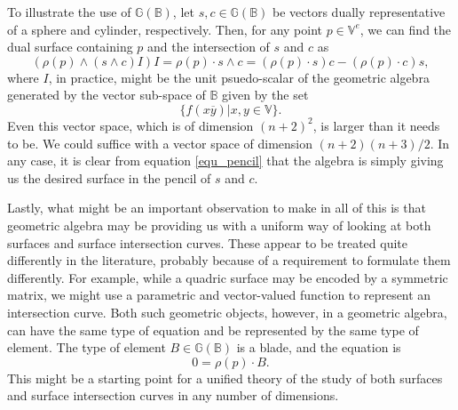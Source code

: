 \documentclass{birkjour}
\theoremstyle{definition}
\theoremstyle{remark}
\numberwithin{equation}{section}
\newcommand{\G}{\mathbb{G}}
\newcommand{\V}{\mathbb{V}}
\newcommand{\B}{\mathbb{B}}
\begin{document}
To illustrate the use of $\G(\B)$, let $s,c\in\G(\B)$ be vectors dually representative
of a sphere and cylinder, respectively.  Then, for any point $p\in\V^e$, we can find
the dual surface containing $p$ and the intersection of $s$ and $c$ as
\begin{equation}\label{equ_pencil}
(\rho(p)\wedge(s\wedge c)I)I = \rho(p)\cdot s\wedge c = (\rho(p)\cdot s)c - (\rho(p)\cdot c)s,
\end{equation}
where $I$, in practice, might be the unit psuedo-scalar of the geometric algebra
generated by the vector sub-space of $\B$ given by the set
\begin{equation}
\{f(x\overline{y})|x,y\in\V\}.
\end{equation}
Even this vector space, which is of dimension $(n+2)^2$, is larger than it needs to be.
We could suffice with a vector space of dimension $(n+2)(n+3)/2$.
In any case, it is clear from equation \eqref{equ_pencil} that the algebra
is simply giving us the desired surface in the pencil of $s$ and $c$.

Lastly, what might be an important observation to make in all of this
is that geometric algebra may be providing us with a uniform way of looking
at both surfaces and surface intersection curves.  These appear to be
treated quite differently in the literature, probably because of a requirement
to formulate them differently.  For example, while a quadric surface
may be encoded by a symmetric matrix, we might use a parametric and
vector-valued function to represent an intersection curve.  Both such geometric objects, however,
in a geometric algebra, can have the same type of equation and be represented by the
same type of element.  The type of element $B\in\G(\B)$ is a blade, and the equation is
\begin{equation}
0 = \rho(p)\cdot B.
\end{equation}
This might be a starting point for
a unified theory of the study of both surfaces and surface intersection
curves in any number of dimensions.

\nocite{Dorst07}



\end{document}
